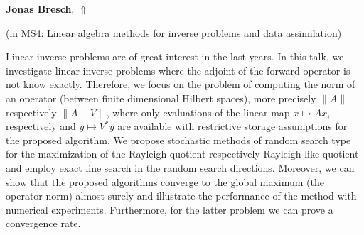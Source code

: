 \documentclass[ILAS2025-program.tex]{subfiles}
\begin{document}
     \hypertarget{down0203}{}\begin{ilasabstract}
    
    \textbf{Jonas Bresch},  \hfill \hyperlink{up0203}{$\Uparrow$}
    
    (in {\color{mstitle}MS4: Linear algebra methods for inverse problems and data assimilation})
        
        \mtskip
    Linear inverse problems are of great interest in the last years.
In this talk, we investigate linear inverse problems where the adjoint of the forward operator is not know exactly.
Therefore, we focus on the problem of computing the norm of an operator (between finite dimensional Hilbert spaces),
more precisely $\|A\|$ respectively $\|A - V\|$,
where only evaluations of the linear map $x \mapsto A x$, 
respectively and $y \mapsto V^*y$ are available 
with restrictive storage assumptions for the proposed algorithm.
We propose stochastic methods of random search type for the maximization of the Rayleigh quotient
respectively Rayleigh-like quotient
and employ exact line search in the random search directions.
Moreover, 
we can show that the proposed algorithms converge to the global maximum 
(the operator norm) almost surely 
and illustrate the performance of the method with numerical experiments.
Furthermore, 
for the latter problem we can prove a convergence rate.
\end{ilasabstract}
\end{document}
